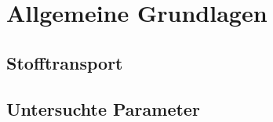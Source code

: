 \chapter{Allgemeine Grundlagen}\label{ch:basics}
\section{Stofftransport}

\section{Untersuchte Parameter}